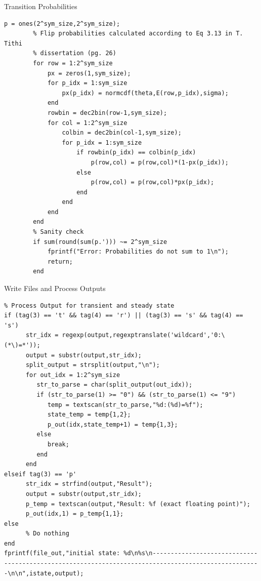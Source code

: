 \documentclass[10pt,ignorenonframetext,]{beamer}
\begin{document}
\begin{frame}[fragile]{Transition Probabilities}
\protect\hypertarget{transition-probabilities}{}
\begin{verbatim}
p = ones(2^sym_size,2^sym_size);
        % Flip probabilities calculated according to Eq 3.13 in T. Tithi
        % dissertation (pg. 26)
        for row = 1:2^sym_size
            px = zeros(1,sym_size);
            for p_idx = 1:sym_size
                px(p_idx) = normcdf(theta,E(row,p_idx),sigma);
            end
            rowbin = dec2bin(row-1,sym_size);
            for col = 1:2^sym_size
                colbin = dec2bin(col-1,sym_size);
                for p_idx = 1:sym_size
                    if rowbin(p_idx) == colbin(p_idx)
                        p(row,col) = p(row,col)*(1-px(p_idx));
                    else
                        p(row,col) = p(row,col)*px(p_idx);
                    end
                end
            end
        end
        % Sanity check
        if sum(round(sum(p.'))) ~= 2^sym_size
            fprintf("Error: Probabilities do not sum to 1\n");
            return;
        end
\end{verbatim}
\end{frame}

\begin{frame}[fragile]{Write Files and Process Outputs}
\protect\hypertarget{write-files-and-process-outputs}{}
\begin{verbatim}
% Process Output for transient and steady state
if (tag(3) == 't' && tag(4) == 'r') || (tag(3) == 's' && tag(4) == 's')
      str_idx = regexp(output,regexptranslate('wildcard','0:\(*\)=*'));
      output = substr(output,str_idx);
      split_output = strsplit(output,"\n"); 
      for out_idx = 1:2^sym_size
         str_to_parse = char(split_output(out_idx));
         if (str_to_parse(1) >= "0") && (str_to_parse(1) <= "9")
            temp = textscan(str_to_parse,"%d:(%d)=%f");
            state_temp = temp{1,2};
            p_out(idx,state_temp+1) = temp{1,3};
         else
            break; 
         end
      end
elseif tag(3) == 'p'
      str_idx = strfind(output,"Result");
      output = substr(output,str_idx);
      p_temp = textscan(output,"Result: %f (exact floating point)");
      p_out(idx,1) = p_temp{1,1};
else
      % Do nothing
end
fprintf(file_out,"initial state: %d\n%s\n----------------------------------------------------------------------------------------------------\n\n",istate,output);
\end{verbatim}
\end{frame}
\end{document}
